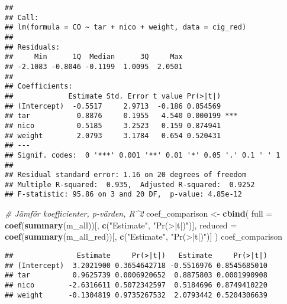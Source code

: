 \documentclass[
  11pt,
]{article}
\newenvironment{Shaded}{\begin{snugshade}}{\end{snugshade}}
\newcommand{\AttributeTok}[1]{\textcolor[rgb]{0.13,0.29,0.53}{#1}}
\newcommand{\CommentTok}[1]{\textcolor[rgb]{0.56,0.35,0.01}{\textit{#1}}}
\newcommand{\FunctionTok}[1]{\textcolor[rgb]{0.13,0.29,0.53}{\textbf{#1}}}
\newcommand{\NormalTok}[1]{#1}
\newcommand{\OtherTok}[1]{\textcolor[rgb]{0.56,0.35,0.01}{#1}}
\newcommand{\SpecialCharTok}[1]{\textcolor[rgb]{0.81,0.36,0.00}{\textbf{#1}}}
\newcommand{\StringTok}[1]{\textcolor[rgb]{0.31,0.60,0.02}{#1}}
\begin{document}
\begin{verbatim}
## 
## Call:
## lm(formula = CO ~ tar + nico + weight, data = cig_red)
## 
## Residuals:
##     Min      1Q  Median      3Q     Max 
## -2.1083 -0.8046 -0.1199  1.0095  2.0501 
## 
## Coefficients:
##             Estimate Std. Error t value Pr(>|t|)    
## (Intercept)  -0.5517     2.9713  -0.186 0.854569    
## tar           0.8876     0.1955   4.540 0.000199 ***
## nico          0.5185     3.2523   0.159 0.874941    
## weight        2.0793     3.1784   0.654 0.520431    
## ---
## Signif. codes:  0 '***' 0.001 '**' 0.01 '*' 0.05 '.' 0.1 ' ' 1
## 
## Residual standard error: 1.16 on 20 degrees of freedom
## Multiple R-squared:  0.935,  Adjusted R-squared:  0.9252 
## F-statistic: 95.86 on 3 and 20 DF,  p-value: 4.85e-12
\end{verbatim}

\begin{Shaded}
\begin{Highlighting}[]
\CommentTok{\# Jämför koefficienter, p{-}värden, R\^{}2}
\NormalTok{coef\_comparison }\OtherTok{\textless{}{-}} \FunctionTok{cbind}\NormalTok{(}
  \AttributeTok{full =} \FunctionTok{coef}\NormalTok{(}\FunctionTok{summary}\NormalTok{(m\_all))[, }\FunctionTok{c}\NormalTok{(}\StringTok{"Estimate"}\NormalTok{, }\StringTok{"Pr(\textgreater{}|t|)"}\NormalTok{)],}
  \AttributeTok{reduced =} \FunctionTok{coef}\NormalTok{(}\FunctionTok{summary}\NormalTok{(m\_all\_red))[, }\FunctionTok{c}\NormalTok{(}\StringTok{"Estimate"}\NormalTok{, }\StringTok{"Pr(\textgreater{}|t|)"}\NormalTok{)]}
\NormalTok{)}
\NormalTok{coef\_comparison}
\end{Highlighting}
\end{Shaded}

\begin{verbatim}
##               Estimate     Pr(>|t|)   Estimate     Pr(>|t|)
## (Intercept)  3.2021900 0.3654642718 -0.5516976 0.8545685010
## tar          0.9625739 0.0006920652  0.8875803 0.0001990908
## nico        -2.6316611 0.5072342597  0.5184696 0.8749410220
## weight      -0.1304819 0.9735267532  2.0793442 0.5204306639
\end{verbatim}

\begin{Shaded}
\end{Shaded}
\end{document}

